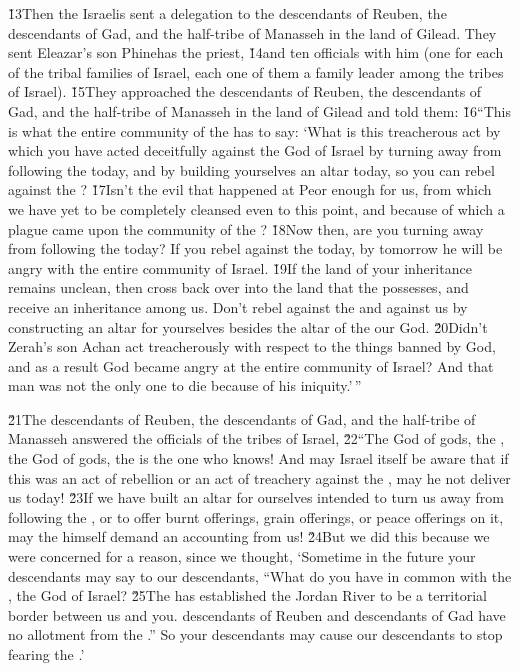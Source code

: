 \v{13}Then the Israelis sent a delegation to the descendants of Reuben, the descendants of Gad, and the half-tribe of Manasseh in the land of Gilead. They sent Eleazar's son Phinehas the priest, \v{14}and ten officials with him (one for each of the tribal families of Israel, each one of them a family leader among the tribes of Israel). \v{15}They approached the descendants of Reuben, the descendants of Gad, and the half-tribe of Manasseh in the land of Gilead and told them: \v{16}``This is what the entire community of the  has to say: `What is this treacherous act by which you have acted deceitfully against the God of Israel by turning away from following the  today, and by building yourselves an altar today, so you can rebel against the ? \v{17}Isn't the evil that happened at Peor enough for us, from which we have yet to be completely cleansed even to this point, and because of which a plague came upon the community of the ? \v{18}Now then, are you turning away from following the  today? If you rebel against the  today, by tomorrow he will be angry with the entire community of Israel. \v{19}If the land of your inheritance remains unclean, then cross back over into the land that the  possesses, and receive an inheritance among us. Don't rebel against the  and against us by constructing an altar for yourselves besides the altar of the  our God. \v{20}Didn't Zerah's son Achan act treacherously with respect to the things banned by God, and as a result God became angry at the entire community of Israel? And that man was not the only one to die because of his iniquity.'\,''

\v{21}The descendants of Reuben, the descendants of Gad, and the half-tribe of Manasseh answered the officials of the tribes of Israel, \v{22}``The God of gods, the , the God of gods, the  is the one who knows! And may Israel itself be aware that if this was an act of rebellion or an act of treachery against the , may he not deliver us today! \v{23}If we have built an altar for ourselves intended to turn us away from following the , or to offer burnt offerings, grain offerings, or peace offerings on it, may the  himself demand an accounting from us! \v{24}But we did this because we were concerned for a reason, since we thought, `Sometime in the future your descendants may say to our descendants, ``What do you have in common with the , the God of Israel? \v{25}The  has established the Jordan River to be a territorial border between us and you. descendants of Reuben and descendants of Gad have no allotment from the .'' So your descendants may cause our descendants to stop fearing the .'

